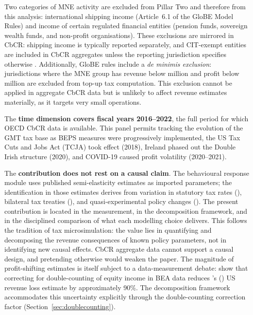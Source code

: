 \documentclass[11pt,a4paper]{article}
\newcommand{\EUR}{\texteuro}
\begin{document}
Two categories of MNE activity are excluded from Pillar Two and therefore from this analysis: international shipping income (Article~6.1 of the GloBE Model Rules) and income of certain regulated financial entities (pension funds, sovereign wealth funds, and non-profit organisations). These exclusions are mirrored in CbCR: shipping income is typically reported separately, and CIT-exempt entities are included in CbCR aggregates unless the reporting jurisdiction specifies otherwise \citep{oecd2025corptaxstats}. Additionally, GloBE rules include a \emph{de minimis exclusion}: jurisdictions where the MNE group has revenue below \EUR10 million and profit below \EUR1 million are excluded from top-up tax computation. This exclusion cannot be applied in aggregate CbCR data but is unlikely to affect revenue estimates materially, as it targets very small operations.

The \textbf{time dimension covers fiscal years 2016--2022}, the full period for which OECD CbCR data is available. This panel permits tracking the evolution of the GMT tax base as BEPS measures were progressively implemented, the US Tax Cuts and Jobs Act (TCJA) took effect (2018), Ireland phased out the Double Irish structure (2020), and COVID-19 caused profit volatility (2020--2021).

The \textbf{contribution does not rest on a causal claim}. The behavioural response module uses published semi-elasticity estimates as imported parameters; the identification in those estimates derives from variation in statutory tax rates (\citealt{dowd2017}), bilateral tax treaties (\citealt{garcia2024}), and quasi-experimental policy changes (\citealt{suarezserrato2019, bilicka2022}). The present contribution is located in the measurement, in the decomposition framework, and in the disciplined comparison of what each modelling choice delivers. This follows the tradition of tax microsimulation: the value lies in quantifying and decomposing the revenue consequences of known policy parameters, not in identifying new causal effects. CbCR aggregate data cannot support a causal design, and pretending otherwise would weaken the paper. The magnitude of profit-shifting estimates is itself subject to a data-measurement debate: \citet{blouin2023} show that correcting for double-counting of equity income in BEA data reduces \citeauthor{clausing2016}'s (\citeyear{clausing2016}) US revenue loss estimate by approximately 90\%. The decomposition framework accommodates this uncertainty explicitly through the double-counting correction factor (Section~\ref{sec:doublecounting}).
\end{document}
